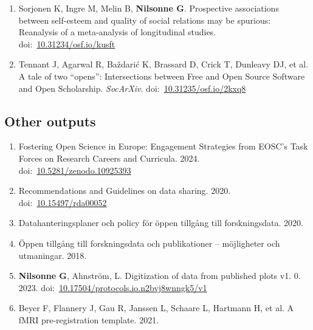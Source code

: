 \documentclass[11pt,a4paper]{article}
\begin{document}
\begin{enumerate}
\item Sorjonen K, Ingre M, Melin B, \textbf{Nilsonne G}. Prospective associations between self-esteem and quality of social relations may be spurious: Reanalysis of a meta-analysis of longitudinal studies. doi:~\href{https://doi.org/10.31234/osf.io/kusft}{10.31234/osf.io/kusft}

\item Tennant J, Agarwal R, Baždarić K, Brassard D, Crick T, Dunleavy DJ, et al. A tale of two “opens”: Intersections between Free and Open Source Software and Open Scholarship. \textit{SocArXiv}. doi:~\href{https://doi.org/10.31235/osf.io/2kxq8}{10.31235/osf.io/2kxq8}

\end{enumerate}



\subsection*{Other outputs}
\begin{enumerate}

\item Fostering Open Science in Europe: Engagement Strategies from EOSC's Task Forces on Research Careers and Curricula. 2024. doi:~\href{https://doi.org/10.5281/zenodo.10925393}{10.5281/zenodo.10925393}

\item Recommendations and Guidelines on data sharing. 2020. doi:~\href{https://doi.org/10.15497/rda00052}{10.15497/rda00052}

\item Datahanteringsplaner och policy för öppen tillgång till forskningsdata. 2020.

\item Öppen tillgång till forskningsdata och publikationer – möjligheter och utmaningar. 2018.

\item \textbf{Nilsonne G}, Ahnström, L. Digitization of data from published plots v1. 0. 2023. doi:~\href{https://doi.org/10.17504/protocols.io.n2bvj8wnngk5/v1}{10.17504/protocols.io.n2bvj8wnngk5/v1}

\item Beyer F, Flannery J, Gau R, Janssen L, Schaare L, Hartmann H, et al. A fMRI pre-registration template. 2021.

\end{enumerate}


\end{document}
